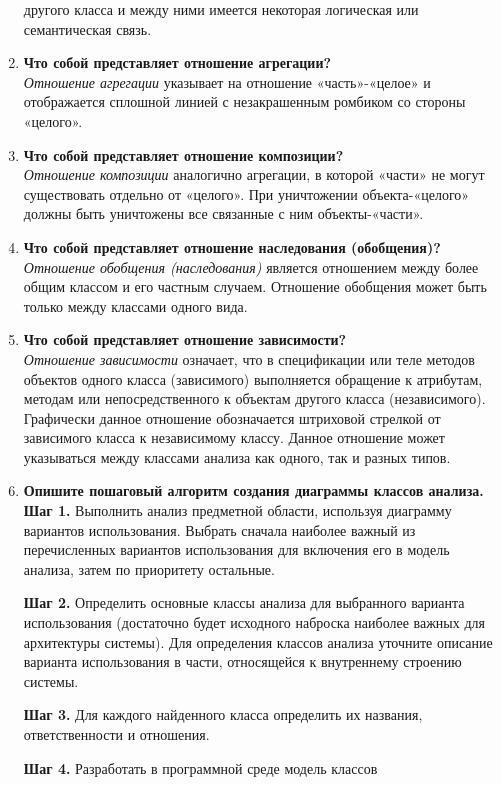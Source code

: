 \begin{enumerate}
		другого класса и между ними имеется некоторая логическая
		или семантическая связь.
	\item \textbf{Что собой представляет отношение агрегации?}\\
		\textit{Отношение агрегации} указывает на отношение «часть»-«целое»
		и отображается сплошной линией с незакрашенным ромбиком
		со стороны «целого».
	\item \textbf{Что собой представляет отношение композиции?}\\
		\textit{Отношение композиции} аналогично агрегации, в которой «части»
		не могут существовать отдельно от «целого». При уничтожении
		объекта-«целого» должны быть уничтожены все связанные с ним
		объекты-«части».
	\item \textbf{Что собой представляет отношение наследования (обобщения)?}\\
		\textit{Отношение обобщения (наследования)} является отношением между
		более общим классом и его частным случаем. Отношение обобщения
		может быть только между классами одного вида.
	\item \textbf{Что собой представляет отношение зависимости?}\\
		\textit{Отношение зависимости} означает, что в спецификации
		или теле методов объектов одного класса (зависимого) выполняется
		обращение к атрибутам, методам или непосредственного к объектам
		другого класса (независимого). Графически данное отношение
		обозначается штриховой стрелкой от зависимого класса к независимому
		классу. Данное отношение может указываться между классами анализа
		как одного, так и разных типов.
	\item \textbf{Опишите пошаговый алгоритм создания диаграммы
		классов анализа.}\\
		\textbf{Шаг 1.} Выполнить анализ предметной области,
		используя диаграмму вариантов использования. Выбрать сначала
		наиболее важный из перечисленных вариантов использования для
		включения его в модель анализа, затем по приоритету остальные.\par
		\textbf{Шаг 2.} Определить основные классы анализа для выбранного
		варианта использования (достаточно будет исходного наброска
		наиболее важных для архитектуры системы). Для определения классов
		анализа уточните описание варианта использования в части,
		относящейся к внутреннему строению системы.\par
		\textbf{Шаг 3.} Для каждого найденного класса определить их
		названия, ответственности и отношения.\par
		\textbf{Шаг 4.} Разработать в программной среде модель классов

\end{enumerate}

